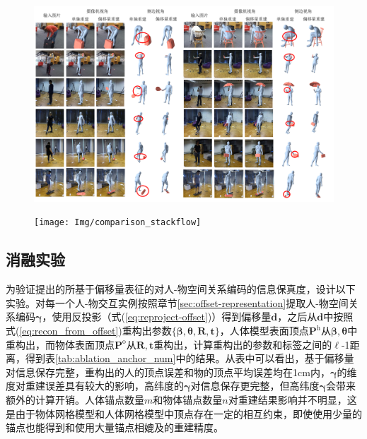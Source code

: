 \begin{figure}[!htbp]
	\centering
	\includegraphics{Img/comparison_intercap}
	\label{fig:comparison-on-intercap}
\end{figure}

\begin{figure}[htbp]
	\centering
	\texttt{[image: Img/comparison\_stackflow]}
	\label{fig:comparison-with-chore}
\end{figure}

\subsection{消融实验}
为验证提出的所基于偏移量表征的对人-物空间关系编码的信息保真度，设计以下实验。对每一个人-物交互实例按照章节\ref{sec:offset-representation}提取人-物空间关系编码$\mathbf{\gamma}$，使用反投影（式(\ref{eq:reproject-offset})）得到偏移量$\mathbf{d}$，之后从$\mathbf{d}$中按照式(\ref{eq:recon_from_offset})重构出参数$\{\mathbf{\beta}, \mathbf{\theta}, \mathbf{R}, \mathbf{t}\}$，人体模型表面顶点$\mathbf{P}^{\text{h}}$从$\mathbf{\beta}, \mathbf{\theta}$中重构出，而物体表面顶点$\mathbf{P}^{\text{o}}$从$\mathbf{R}, \mathbf{t}$重构出，计算重构出的参数和标签之间的$\ell$-1距离，得到表\ref{tab:ablation_anchor_num}中的结果。从表中可以看出，基于偏移量对信息保存完整，重构出的人的顶点误差和物的顶点平均误差均在1cm内，$\mathbf{\gamma}$的维度对重建误差具有较大的影响，高纬度的$\mathbf{\gamma}$对信息保存更完整，但高纬度$\mathbf{\gamma}$会带来额外的计算开销。人体锚点数量$m$和物体锚点数量$n$对重建结果影响并不明显，这是由于物体网格模型和人体网格模型中顶点存在一定的相互约束，即使使用少量的锚点也能得到和使用大量锚点相媲及的重建精度。


